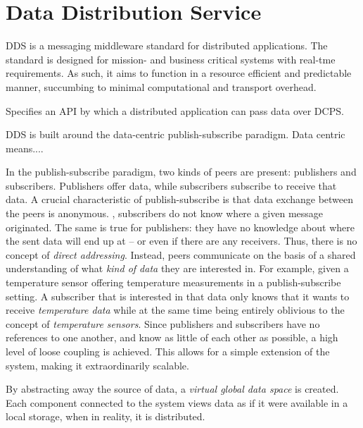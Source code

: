 \section{Data Distribution Service}

DDS is a messaging middleware standard \cite{dds-1.4-standard} for distributed applications. The standard is designed for mission- and business critical systems with real-tme requirements. As such, it aims to function in a resource efficient and predictable manner, succumbing to minimal computational and transport overhead.

Specifies an API by which a distributed application can pass data over DCPS. 



DDS is built around the data-centric publish-subscribe paradigm.
Data centric means....

In the publish-subscribe paradigm, two kinds of peers are present: publishers and subscribers. Publishers offer data, while subscribers subscribe to receive that data. A crucial characteristic of publish-subscribe is that data exchange between the peers is anonymous. \Ie , subscribers do not know where a given message originated. The same is true for publishers: they have no knowledge about where the sent data will end up at -- or even if there are any receivers. Thus, there is no concept of \emph{direct addressing}. Instead, peers communicate on the basis of a shared understanding of what \emph{kind of data} they are interested in. 
For example, given a temperature sensor offering temperature measurements in a publish-subscribe setting. A subscriber that is interested in that data only knows that it wants to receive \emph{temperature data} while at the same time being entirely oblivious to the concept of \emph{temperature sensors}. 
Since publishers and subscribers have no references to one another, and know as little of each other as possible, a high level of loose coupling is achieved. This allows for a simple extension of the system, making it extraordinarily scalable.

By abstracting away the source of data, a \emph{virtual global data space} is created. Each component connected to the system views data as if it were available in a local storage, when in reality, it is distributed.


